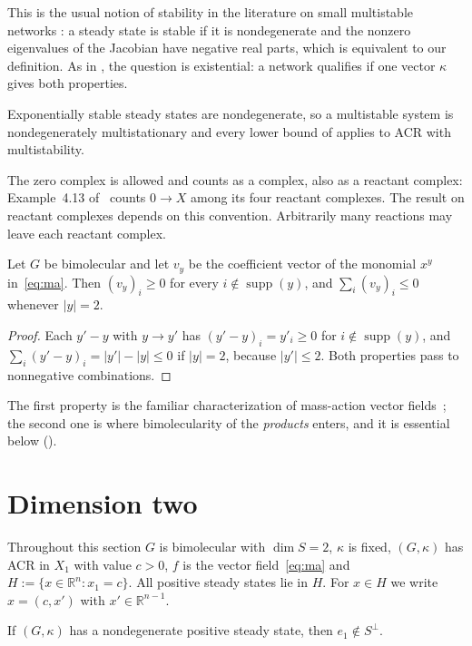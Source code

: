 \documentclass[11pt,a4paper]{report}
\providecommand{\R}{\mathbb{R}}
\newcommand{\supp}{\operatorname{supp}}
\begin{document}
This is the usual notion of stability in the literature on small multistable networks
\autocite[§2.2]{JTZ2025}: a steady state is stable if it is nondegenerate and the nonzero eigenvalues of the Jacobian
have negative real parts, which is equivalent to our definition. As in \autocite[Theorem~1.2]{KNS2024}, the
question is existential: a network qualifies if one vector $\kappa$ gives both properties.

Exponentially stable steady states are nondegenerate, so a multistable system is nondegenerately multistationary and
every lower bound of \autocite{KNS2024} applies to ACR with multistability.

The zero complex is allowed and counts as a complex, also as a reactant complex: Example~4.13
of~\autocite{KNS2024} counts $0\to X$ among its four reactant complexes. The result on reactant complexes depends on
this convention. Arbitrarily many reactions may leave each reactant complex.

\begin{lemma}\label{lem:cones}
Let $G$ be bimolecular and let $v_y$ be the coefficient vector of the monomial $x^y$ in~\eqref{eq:ma}. Then
$(v_y)_i\ge 0$ for every $i\notin\supp(y)$, and $\sum_i (v_y)_i\le 0$ whenever $|y|=2$.
\end{lemma}

\begin{proof}
Each $y'-y$ with $y\to y'$ has $(y'-y)_i=y'_i\ge 0$ for $i\notin\supp(y)$, and $\sum_i(y'-y)_i=|y'|-|y|\le 0$ if
$|y|=2$, because $|y'|\le 2$. Both properties pass to nonnegative combinations.
\end{proof}

The first property is the familiar characterization of mass-action vector fields~\autocite[Lemma~2.3]{KNS2024}; the
second one is where bimolecularity of the \emph{products} enters, and it is essential below
().

\section{Dimension two}\label{sec:dim-two}

Throughout this section $G$ is bimolecular with $\dim S=2$, $\kappa$ is fixed, $(G,\kappa)$ has ACR in $X_1$ with
value $c>0$, $f$ is the vector field~\eqref{eq:ma} and $H:=\{x\in\R^n\colon x_1=c\}$. All positive steady states lie
in $H$. For $x\in H$ we write $x=(c,x')$ with $x'\in\R^{n-1}$.

\begin{lemma}\label{lem:not-conserved}
If $(G,\kappa)$ has a nondegenerate positive steady state, then $e_1\notin S^\perp$.
\end{lemma}
\end{document}
